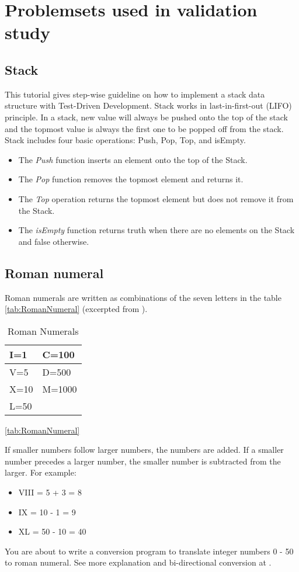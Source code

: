 \chapter{Problemsets used in validation study}
\label{app:problems}
\section{Stack}
\noindent This tutorial gives step-wise guideline on how to implement a 
stack data structure with Test-Driven Development. Stack works in
last-in-first-out (LIFO) principle. In a stack, new value will always be
pushed onto the top of the stack and the topmost value is always the first
one to be popped off from the stack. Stack includes four basic operations:
Push, Pop, Top, and isEmpty.
\begin{itemize}
\item The \textit{Push} function inserts an element onto the top of the
  Stack.
\item The \textit{Pop} function removes the topmost element and returns it.
\item The \textit{Top} operation returns the topmost element but does not
  remove it from the Stack.
\item The \textit{isEmpty} function returns truth when there are no
  elements on the Stack and false otherwise.
\end{itemize}

\section{Roman numeral}
\noindent Roman numerals are written as combinations of the seven letters 
in the table \ref{tab:RomanNumeral} (excerpted from
\cite{DictRomanNumeral}).
\begin{table}[!htbp]
  \centering
  \begin{tabular}{|l|l|} \hline
  I=1 & C=100 \\ \hline
  V=5 & D=500 \\ \hline
  X=10 & M=1000 \\ \hline
  L=50 & \\ \hline
  \end{tabular}
  \caption{Roman Numerals} \ref{tab:RomanNumeral}
\end{table}
If smaller numbers follow larger numbers, the numbers are added. 
If a smaller number precedes a larger number, the smaller number is
subtracted from the larger. For example:
\begin{itemize}
\item VIII =   5 +   3 =  8
\item IX   = 10  -   1 =  9
\item XL  =  50  - 10 = 40
\end{itemize}
You are about to write a conversion program to translate integer numbers 0
- 50 to roman numeral. See more explanation and bi-directional conversion
at \cite{RomanNumeralSize}.

